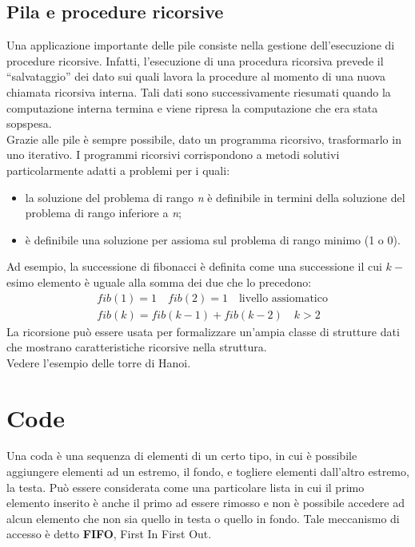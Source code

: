 \documentclass[12pt]{report}
\begin{document}
	\section{Pila e procedure ricorsive}
	Una applicazione importante delle pile consiste nella gestione dell'esecuzione di procedure ricorsive. Infatti, l'esecuzione di una procedura ricorsiva prevede il ``salvataggio'' dei dato sui quali lavora la procedure al momento di una nuova chiamata ricorsiva interna. Tali dati sono successivamente riesumati quando la computazione interna termina e viene ripresa la computazione che era stata sopspesa. \\
	Grazie alle pile è sempre possibile, dato un programma ricorsivo, trasformarlo in uno iterativo. I programmi ricorsivi corrispondono a metodi solutivi particolarmente adatti a problemi per i quali:
	\begin{itemize}
		\item la soluzione del problema di rango \textit{n} è definibile in termini della soluzione del problema di rango inferiore a \textit{n};
		\item è definibile una soluzione per assioma sul problema di rango minimo (1 o 0).
	\end{itemize}
	Ad esempio, la successione di fibonacci è definita come una successione il cui $k-$esimo elemento è uguale alla somma dei due che lo precedono:
	\begin{align*}
		&fib(1) = 1 \quad fib(2) = 1 \quad \text{livello assiomatico} \\
		&fib(k) = fib(k - 1) + fib(k - 2) \quad k > 2
	\end{align*}
	La ricorsione può essere usata per formalizzare un'ampia classe di strutture dati che mostrano caratteristiche ricorsive nella struttura.  \\
	Vedere l'esempio delle torre di Hanoi.
	\chapter{Code}
	Una coda è una sequenza di elementi di un certo tipo, in cui è possibile aggiungere elementi ad un estremo, il fondo, e togliere elementi dall'altro estremo, la testa. Può essere considerata come una particolare lista in cui il primo elemento inserito è anche il primo ad essere rimosso e non è possibile accedere ad alcun elemento che non sia quello in testa o quello in fondo. Tale meccanismo di accesso è detto \textbf{FIFO}, First In First Out.
\end{document}
